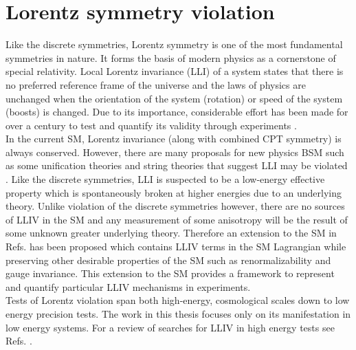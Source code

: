\documentclass[10pt,a4paper, twoside, openright]{report}
\begin{document}
\section{Lorentz symmetry violation} \label{sec:Lorentz}
Like the discrete symmetries, Lorentz symmetry is one of the most fundamental symmetries in nature. It forms the basis of modern physics as a cornerstone of special relativity. Local Lorentz invariance (LLI) of a system states that there is no preferred reference frame of the universe and the laws of physics are unchanged when the orientation of the system (rotation) or speed of the system (boosts) is changed. Due to its importance, considerable effort has been made for over a century to test and quantify its validity through experiments \cite{Michelson1887, Kennedy1932, Ives1938, Robertson1949, LorentzTestSeries}.  \\
\linebreak
In the current SM, Lorentz invariance (along with combined CPT symmetry) is always conserved. However, there are many proposals for new physics BSM such as some unification theories and string theories that suggest LLI may be violated \cite{Kostelecky1989,  Damour, Gambini1999, Pospelov2012, Kostelecky1995, Mavromatos2007, Liberati2013}.  Like the discrete symmetries, LLI is suspected to be a low-energy effective property which is spontaneously broken at higher energies due to an underlying theory. Unlike violation of the discrete symmetries however,  there  are no sources of LLIV in the SM and any measurement of some anisotropy will be the result of some unknown greater underlying theory. Therefore an extension to the SM in Refs. \cite{Colladay1997, Colladay1998, Kostelecky1999, LorentzDataTables2019} has been proposed which contains LLIV terms in the SM Lagrangian while preserving other desirable properties of the SM such as renormalizability and gauge invariance. This extension to the SM provides a framework to represent and quantify particular LLIV mechanisms in experiments. \\
\linebreak
Tests of Lorentz violation span both high-energy, cosmological scales down to low energy precision tests. The work in this thesis focuses only on its manifestation in low energy systems.  For a review of searches for LLIV in high energy tests see Refs. \cite{Coleman1999, Liberati2009, Stecker2012}.   \\
\linebreak
\end{document}
